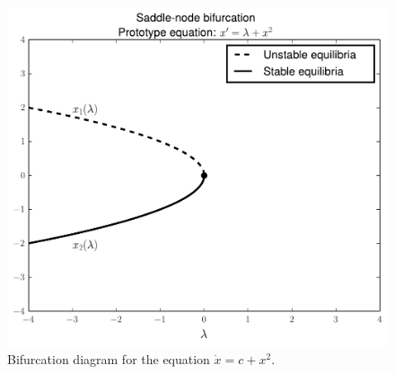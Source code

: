 \begin{figure}[ht]
\centering
\includegraphics[width=\textwidth]{SaddleNBifurcation.pdf}
\caption{Bifurcation diagram for the equation $\dot{x} = c + x^2$.}
\label{bifurcation:sn}
\end{figure}

\newpage
% 

%  

